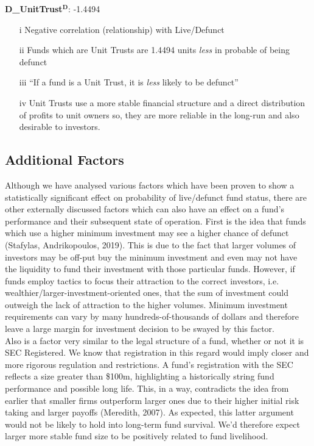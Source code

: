 \documentclass[11pt, english]{article}
\begin{document}
	\textbf{D\_UnitTrust$\mathbf{^D}$}: -1.4494

        \begin{itemize}
        \setlength\itemsep{0cm}
                \item[i] Negative correlation (relationship) with Live/Defunct
		\item[ii] Funds which are Unit Trusts are 1.4494 units \textit{less} in probable of being defunct
		\item[iii] ``If a fund is a Unit Trust, it is \textit{less} likely to be defunct''
                \item[iv] Unit Trusts use a more stable financial structure and a direct distribution of profits to unit owners so, they are more reliable in the long-run and also desirable to investors.
        \end{itemize}

	\subsection{Additional Factors}

	Although we have analysed various factors which have been proven to show a statistically significant effect on probability of live/defunct fund status, there are other externally discussed factors which can also have an effect on a fund's performance and their subsequent state of operation. First is the idea that funds which use a higher minimum investment may see a higher chance of defunct (Stafylas, Andrikopoulos, 2019). This is due to the fact that larger volumes of investors may be off-put buy the minimum investment and even may not have the liquidity to fund their investment with those particular funds. However, if funds employ tactics to focus their attraction to the correct investors, i.e. wealthier/larger-investment-oriented ones, that the sum of investment could outweigh the lack of attraction to the higher volumes. Minimum investment requirements can vary by many hundreds-of-thousands of dollars and therefore leave a large margin for investment decision to be swayed by this factor.\\

	Also is a factor very similar to the legal structure of a fund, whether or not it is SEC Registered. We know that registration in this regard would imply closer and more rigorous regulation and restrictions. A fund's registration with the SEC reflects a size greater than \$100m, highlighting a historically string fund performance and possible long life. This, in a way, contradicts the idea from earlier that smaller firms outperform larger ones due to their higher initial risk taking and larger payoffs (Meredith, 2007). As expected, this latter argument would not be likely to hold into long-term fund survival. We'd therefore expect larger more stable fund size to be positively related to fund livelihood.\\
\end{document}
